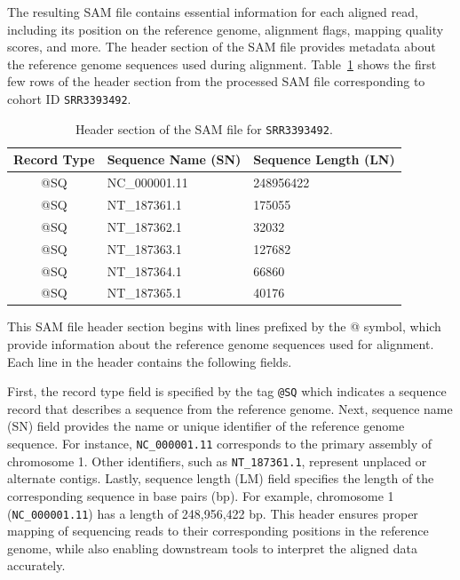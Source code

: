 \documentclass{article}
\begin{document}
The resulting SAM file contains essential information for each aligned read, including its position on the reference genome, alignment flags, mapping quality scores, and more. The header section of the SAM file provides metadata about the reference genome sequences used during alignment. Table~\ref{table:sam_header} shows the first few rows of the header section from the processed SAM file corresponding to cohort ID \texttt{SRR3393492}.
\begin{table}[H]
    \centering
    \begin{tabular}{cll}
        \toprule
        Record Type & Sequence Name (SN) & Sequence Length (LN) \\
        \midrule
        @SQ & NC\_000001.11 & 248956422 \\
        @SQ & NT\_187361.1 & 175055 \\
        @SQ & NT\_187362.1 & 32032 \\
        @SQ & NT\_187363.1 & 127682 \\
        @SQ & NT\_187364.1 & 66860 \\
        @SQ & NT\_187365.1 & 40176 \\
        \bottomrule
    \end{tabular}
    \caption{Header section of the SAM file for \texttt{SRR3393492}.}
    \label{table:sam_header}
\end{table}
This SAM file header section begins with lines prefixed by the @ symbol, which provide information about the reference genome sequences used for alignment. Each line in the header contains the following fields.

First, the record type field is specified by the tag \texttt{@SQ} which indicates a sequence record that describes a sequence from the reference genome. Next, sequence name (SN) field provides the name or unique identifier of the reference genome sequence. For instance, \texttt{NC\_000001.11} corresponds to the primary assembly of chromosome 1. Other identifiers, such as \texttt{NT\_187361.1}, represent unplaced or alternate contigs. Lastly, sequence length (LM) field specifies the length of the corresponding sequence in base pairs (bp). For example, chromosome 1 (\texttt{NC\_000001.11}) has a length of 248,956,422 bp. This header ensures proper mapping of sequencing reads to their corresponding positions in the reference genome, while also enabling downstream tools to interpret the aligned data accurately.
\end{document}
